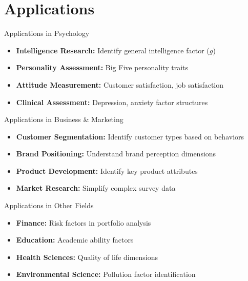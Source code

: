 \documentclass[aspectratio=169]{beamer}
\begin{document}
\section{Applications}
\begin{frame}{Applications in Psychology}
  \begin{itemize}
    \item \textbf{Intelligence Research:} Identify general intelligence factor ($g$)
    \item \textbf{Personality Assessment:} Big Five personality traits
    \item \textbf{Attitude Measurement:} Customer satisfaction, job satisfaction
    \item \textbf{Clinical Assessment:} Depression, anxiety factor structures
  \end{itemize}
\end{frame}

\begin{frame}{Applications in Business \& Marketing}
  \begin{itemize}
    \item \textbf{Customer Segmentation:} Identify customer types based on behaviors
    \item \textbf{Brand Positioning:} Understand brand perception dimensions
    \item \textbf{Product Development:} Identify key product attributes
    \item \textbf{Market Research:} Simplify complex survey data
  \end{itemize}
\end{frame}

\begin{frame}{Applications in Other Fields}
  \begin{itemize}
    \item \textbf{Finance:} Risk factors in portfolio analysis
    \item \textbf{Education:} Academic ability factors
    \item \textbf{Health Sciences:} Quality of life dimensions
    \item \textbf{Environmental Science:} Pollution factor identification
  \end{itemize}
\end{frame}
\end{document}
